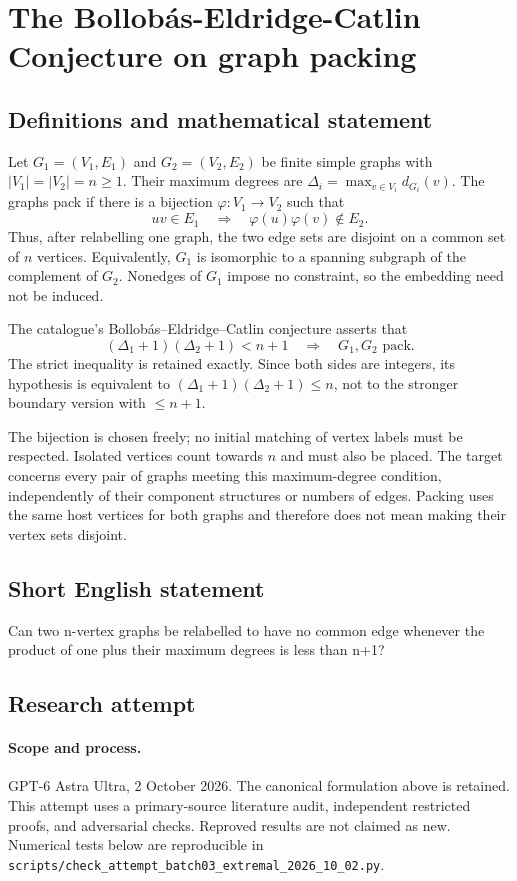 \documentclass[11pt,a4paper]{article}
\begin{document}
\section*{The Bollobás-Eldridge-Catlin Conjecture on graph packing}\label{statement}

\subsection{Definitions and mathematical statement}
Let $G_1=(V_1,E_1)$ and $G_2=(V_2,E_2)$ be finite simple graphs with
$|V_1|=|V_2|=n\ge1$. Their maximum degrees are
$\Delta_i=\max_{v\in V_i}d_{G_i}(v)$. The graphs pack if there is a
bijection $\varphi:V_1\to V_2$ such that
\[
                  uv\in E_1\quad\Longrightarrow\quad
                  \varphi(u)\varphi(v)\notin E_2.
\]
Thus, after relabelling one graph, the two edge sets are disjoint on
a common set of $n$ vertices. Equivalently, $G_1$ is isomorphic to a
spanning subgraph of the complement of $G_2$. Nonedges of $G_1$ impose
no constraint, so the embedding need not be induced.

The catalogue's Bollobás--Eldridge--Catlin conjecture asserts that
\[
                       (\Delta_1+1)(\Delta_2+1)<n+1
              \quad\Longrightarrow\quad G_1,G_2\text{ pack}.
\]
The strict inequality is retained exactly. Since both sides are
integers, its hypothesis is equivalent to
$(\Delta_1+1)(\Delta_2+1)\le n$, not to the stronger boundary version
with $\le n+1$.

The bijection is chosen freely; no initial matching of vertex labels
must be respected. Isolated vertices count towards $n$ and must also
be placed. The target concerns every pair of graphs meeting this
maximum-degree condition, independently of their component structures
or numbers of edges. Packing uses the same host vertices for both
graphs and therefore does not mean making their vertex sets disjoint.
\subsection{Short English statement}
Can two n-vertex graphs be relabelled to have no common edge whenever the product of one plus their maximum degrees is less than n+1?
\subsection{Research attempt}
\paragraph{Scope and process.}
GPT-6 Astra Ultra, 2 October 2026. The canonical formulation above is retained. This attempt uses a primary-source literature audit, independent restricted proofs, and adversarial checks. Reproved results are not claimed as new. Numerical tests below are reproducible in \texttt{scripts/check\_attempt\_batch03\_extremal\_2026\_10\_02.py}.
\end{document}

